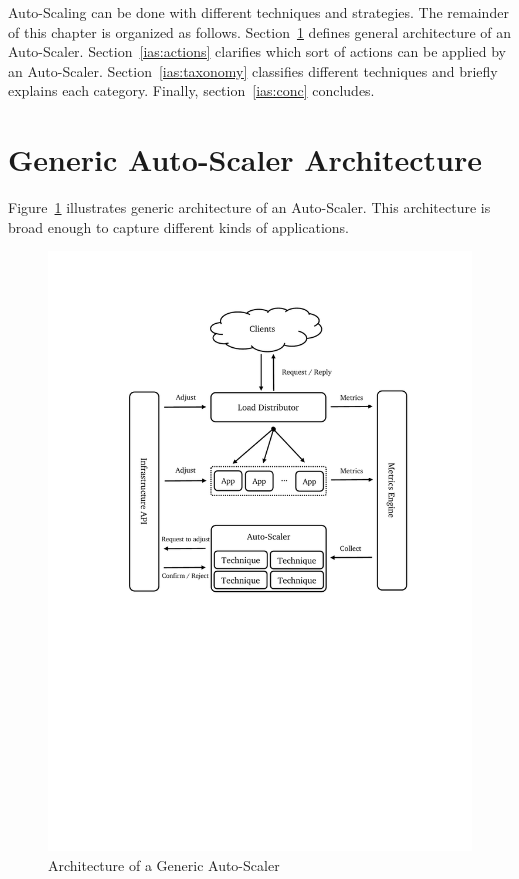 Auto-Scaling can be done with different techniques and strategies. The remainder of this chapter is organized as follows. Section~\ref{ias:arch} defines general architecture of an Auto-Scaler. Section~\ref{ias:actions} clarifies which sort of actions can be applied by an Auto-Scaler. Section~\ref{ias:taxonomy} classifies different techniques and briefly explains each category. Finally, section~\ref{ias:conc} concludes.

\section{Generic Auto-Scaler Architecture}
\label{ias:arch}

Figure~\ref{fig:auto-scaler-arch} illustrates generic architecture of an Auto-Scaler. This architecture is broad enough to capture different kinds of applications.
\begin{figure}[ht]
    \centering
    \includegraphics[clip, trim=3cm 12.5cm 2.5cm 2.5cm]{auto-scaler-arch.pdf}
    \caption{Architecture of a Generic Auto-Scaler}
    \label{fig:auto-scaler-arch}
\end{figure}
